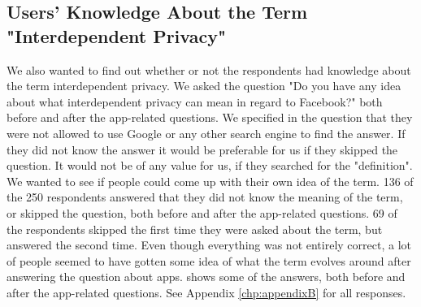 \subsection{Users' Knowledge About the Term "Interdependent Privacy"}
We also wanted to find out whether or not the respondents had knowledge about the term interdependent privacy. We asked the question "Do you have any idea about what interdependent privacy can mean in regard to Facebook?" both before and after the app-related questions. We specified in the question that they were not allowed to use Google or any other search engine to find the answer. If they did not know the answer it would be preferable for us if they skipped the question. It would not be of any value for us, if they searched for the "definition". We wanted to see if people could come up with their own idea of the term. 136 of the 250 respondents answered that they did not know the meaning of the term, or skipped the question, both before and after the app-related questions. 69 of the respondents skipped the first time they were asked about the term, but answered the second time. Even though everything was not entirely correct, a lot of people seemed to have gotten some idea of what the term evolves around after answering the question about apps.  shows some of the answers, both before and after the app-related questions. See Appendix \ref{chp:appendixB} for all responses.   


